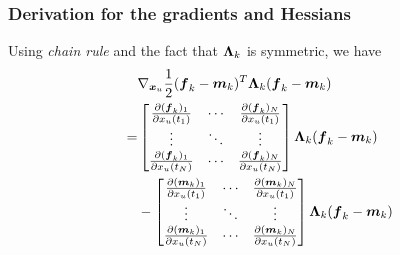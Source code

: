 \begin{frame}[t]
    \frametitle{Derivation for the gradients and Hessians}
    Using \emph{chain rule} and the fact that $\boldsymbol{\Lambda}_{k}$ is symmetric, we have
    \begin{align}
        & \nabla_{\boldsymbol{x}_{u}}\frac{1}{2}(\boldsymbol{f}_{k}-\boldsymbol{m}_{k})^T\boldsymbol{\Lambda}_{k}(\boldsymbol{f}_{k}-\boldsymbol{m}_{k})
        \nonumber
        \\
        = &
        \begin{bmatrix}
            \frac{\partial(\boldsymbol{f}_{k})_1}{\partial x_{u}(t_{1})} 
            & 
            \cdots 
            & 
            \frac{\partial(\boldsymbol{f}_{k})_N}{\partial x_{u}(t_{1})}
            \\
            \vdots 
            &
            \ddots
            &
            \vdots
            \\
            \frac{\partial(\boldsymbol{f}_{k})_1}{\partial x_{u}(t_{N})} 
            &
            \cdots
            &
            \frac{\partial(\boldsymbol{f}_{k})_N}{\partial x_{u}(t_{N})} 
        \end{bmatrix}
        \boldsymbol{\Lambda}_{k}(\boldsymbol{f}_{k}-\boldsymbol{m}_{k}) 
        \nonumber
        \\
        & -
        \begin{bmatrix}
            \frac{\partial(\boldsymbol{m}_{k})_1}{\partial x_{u}(t_{1})} 
            & 
            \cdots 
            & 
            \frac{\partial(\boldsymbol{m}_{k})_N}{\partial x_{u}(t_{1})}
            \\
            \vdots 
            &
            \ddots
            &
            \vdots
            \\
            \frac{\partial(\boldsymbol{m}_{k})_1}{\partial x_{u}(t_{N})} 
            &
            \cdots
            &
            \frac{\partial(\boldsymbol{m}_{k})_N}{\partial x_{u}(t_{N})} 
        \end{bmatrix}
        \boldsymbol{\Lambda}_{k}(\boldsymbol{f}_{k}-\boldsymbol{m}_{k})  
    \end{align}
\end{frame}

